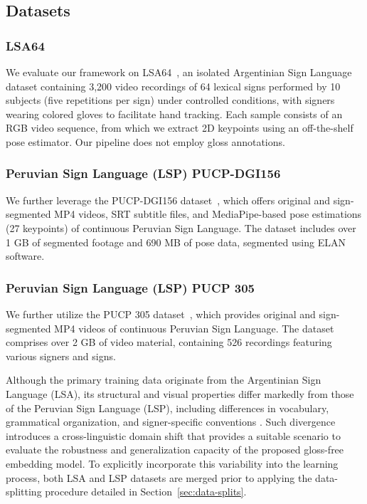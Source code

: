 \documentclass[runningheads]{llncs}
\begin{document}
\subsection{Datasets}

\subsubsection{LSA64}
We evaluate our framework on LSA64~\cite{Ronchetti2016}, an isolated Argentinian Sign Language dataset containing 3,200 video recordings of 64 lexical signs performed by 10 subjects (five repetitions per sign) under controlled conditions, with signers wearing colored gloves to facilitate hand tracking. Each sample consists of an RGB video sequence, from which we extract 2D keypoints using an off-the-shelf pose estimator. Our pipeline does not employ gloss annotations.

\subsubsection{Peruvian Sign Language (LSP) PUCP-DGI156}
We further leverage the PUCP-DGI156 dataset~\cite{ojyyys_2022}, which offers original and sign-segmented MP4 videos, SRT subtitle files, and MediaPipe-based pose estimations (27 keypoints) of continuous Peruvian Sign Language. The dataset includes over 1 GB of segmented footage and 690 MB of pose data, segmented using ELAN software.

\subsubsection{Peruvian Sign Language (LSP) PUCP 305}
We further utilize the PUCP 305 dataset~\cite{JU4OLG_2024}, which provides original and sign-segmented MP4 videos of continuous Peruvian Sign Language. The dataset comprises over 2 GB of video material, containing 526 recordings featuring various signers and signs.

\noindent  Although the primary training data originate from the Argentinian Sign Language (LSA), its structural and visual properties differ markedly from those of the Peruvian Sign Language (LSP), including differences in vocabulary, grammatical organization, and signer-specific conventions \cite{ronchetti2023lsa, ojyyys_2022}. Such divergence introduces a cross-linguistic domain shift that provides a suitable scenario to evaluate the robustness and generalization capacity of the proposed gloss-free embedding model. To explicitly incorporate this variability into the learning process, both LSA and LSP datasets are merged prior to applying the data-splitting procedure detailed in Section~\ref{sec:data-splits}.
\end{document}
